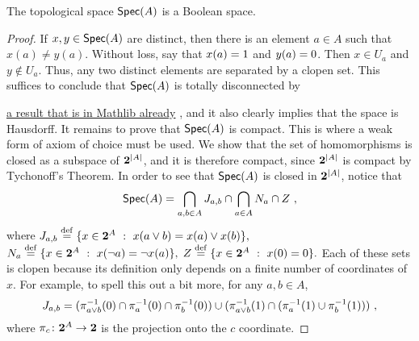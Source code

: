 \documentclass[a4paper,10pt]{article}
\numberwithin{theorem}{section}
\newcommand{\docref}[3]{
    \href{
        https://leanprover-community.github.io/mathlib4_docs/Mathlib/#1.html\##2
    }{#3}
}
\begin{document}
\begin{theorem}
    The topological space $\operatorname*{\mathsf{Spec}}(A)$ is a Boolean space.
\end{theorem}
\begin{proof}
    If $x, y \in \operatorname*{\mathsf{Spec}}(A)$ are distinct, then there is an element $a \in A$
    such that $x(a) \neq y(a)$. Without loss, say that $x(a) = 1$ and $y(a)
    = 0$. Then $x \in U_a$ and $y \not\in U_a$. Thus, any two distinct
    elements are separated by a clopen set. This suffices to conclude that
    $\operatorname*{\mathsf{Spec}}(A)$ is totally disconnected by
    \docref{Topology/Connected/TotallyDisconnected}
    {isTotallyDisconnected_of_isClopen_set}{a result that is in Mathlib
    already}, and it also clearly implies that the space is Hausdorff. It
    remains to prove that $\operatorname*{\mathsf{Spec}}(A)$ is compact. This is where a weak form of
    axiom of choice must be used. We show that the set of homomorphisms is
    closed as a subspace of $\mathbf{2}^{|A|}$, and it is therefore compact, since
    $\mathbf{2}^{|A|}$ is compact by Tychonoff's Theorem. In order to see that
    $\operatorname*{\mathsf{Spec}}(A)$ is closed in $\mathbf{2}^{|A|}$, notice that \[ \Spec(A) =
    \bigcap_{a,b\in A} J_{a,b} \cap \bigcap_{a \in A} N_a \cap Z \ , \]
    where $J_{a,b} \stackrel{\mathrm{def}}{=} \{ x \in \mathbf{2}^A \ : \ x(a \vee b) = x(a) \vee x(b)
    \},$ $N_a \stackrel{\mathrm{def}}{=}  \{x \in \mathbf{2}^A \ : \ x(\neg a) = \neg x(a) \},$ $Z
    \stackrel{\mathrm{def}}{=} \{ x \in \mathbf{2}^A \ : \ x(0) = 0\}.$ Each of these sets is
    clopen because its definition only depends on a finite number of
    coordinates of $x$. For example, to spell this out a bit more, for any $a,
    b \in A$,
    \[ J_{a,b} = 
        (\pi_{a \vee b}^{-1}(0) \cap \pi_{a}^{-1}(0) \cap
        \pi_{b}^{-1}(0)) \cup (\pi_{a \vee b}^{-1}(1) \cap
    (\pi_a^{-1}(1) \cup \pi_b^{-1}(1))) \ , \]
    where $\pi_c \colon \mathbf{2}^A \to \mathbf{2}$ is the projection onto the $c$
    coordinate.\qedhere

\end{proof}
\end{document}
